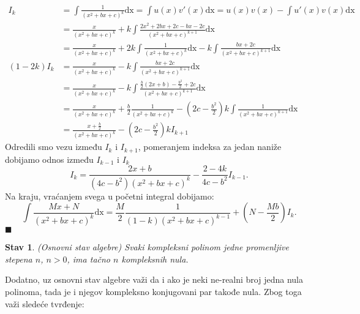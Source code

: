 \documentclass{article}
\newtheorem{stav}{Stav}[section]
\begin{document}
\begin{align*}
    I_k       & =\int\frac{1}{(x^2+bx+c)^k}\text{dx} =\int u(x)v'(x)\text{dx} =u(x)v(x)-\int u'(x)v(x)\text{dx}                         \\
              & =\frac{x}{(x^2+bx+c)^k}+k\int\frac{2x^2+2bx+2c-bx-2c}{(x^2+bx+c)^{k+1}} \text{dx}                                       \\
              & =\frac{x}{(x^2+bx+c)^k}+2k\int\frac{1}{(x^2+bx+c)^k}\text{dx}-k\int\frac{bx+2c}{(x^2+bx+c)^{k+1}} \text{dx}             \\
    (1-2k)I_k & =\frac{x}{(x^2+bx+c)^k}-k\int\frac{bx+2c}{(x^2+bx+c)^{k+1}} \text{dx}                                                   \\
              & =\frac{x}{(x^2+bx+c)^k}-k\int\frac{\frac{b}{2}(2x+b)-\frac{b^2}{2}+2c}{(x^2+bx+c)^{k+1}} \text{dx}                      \\
              & =\frac{x}{(x^2+bx+c)^k}+\frac{b}{2}\frac{1}{(x^2+bx+c)^{k}}-(2c-\frac{b^2}{2})k\int\frac{1}{(x^2+bx+c)^{k+1}} \text{dx} \\
              & =\frac{x+\frac{b}{2}}{(x^2+bx+c)^k}-(2c-\frac{b^2}{2})kI_{k+1}
\end{align*}
Odredili smo vezu između $I_k$ i $I_{k+1}$, pomeranjem indeksa za jedan
naniže dobijamo odnos između $I_{k-1}$ i $I_k$
$$I_k =\frac{2x+b}{(4c-b^2)(x^2+bx+c)^k}-\frac{2-4k}{4c-b^2}I_{k-1}.$$
Na kraju, vraćanjem svega u početni integral dobijamo:
$$    \int \frac{Mx+N}{(x^2+bx+c)^k}\text{dx}=\frac{M}{2}\frac{1}{(1-k)(x^2+bx+c)^{k-1}}+(N-\frac{Mb}{2})I_k.$$
\null\hfill $\blacksquare$\par

\begin{stavbox}
    \begin{stav}\label{OSA}
        (Osnovni stav algebre) Svaki kompleksni polinom
        jedne promenljive stepena $n$, $n>0$, ima tačno
        $n$ kompleksnih nula.
    \end{stav}
\end{stavbox}

Dodatno, uz osnovni stav algebre važi da i ako je neki ne-realni
broj jedna nula polinoma, tada je i njegov kompleksno konjugovani
par takođe nula. Zbog toga važi sledeće tvrđenje:
\end{document}
